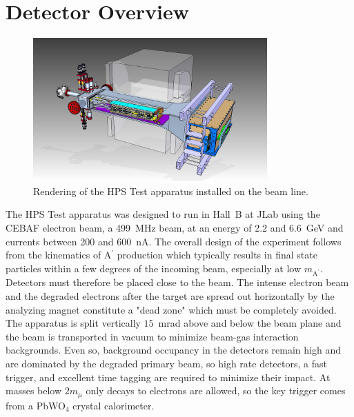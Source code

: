 \documentclass[final,3p,times,twocolumn]{elsarticle}
\newcommand{\Aprime}{A\ensuremath{^\prime}}
\begin{document}
\section{Detector Overview}
\label{detector}
{\small
\begin{figure}[t]
\begin{center}
    \includegraphics[width=0.8\textwidth]{figures/hps_testrun_rendering}
\caption{Rendering of the HPS Test apparatus installed on the beam line.}
\label{fig:testrundetector}
\end{center}
\end{figure}
}
The HPS Test apparatus was designed to run in Hall~B at JLab using the CEBAF electron beam, a 
499~MHz beam, at an energy of 2.2 and 6.6~GeV and currents between 200 and 600~nA.  
The overall design of the experiment follows from the kinematics of \Aprime{} production which 
typically results in final state particles within a few degrees of the incoming beam, especially at low 
$m_{\textrm{A}^\prime}$. Detectors must therefore be placed close to the beam. 
The intense electron beam and the degraded electrons after the target are spread out horizontally by 
the analyzing magnet constitute a "dead zone" which must be completely avoided. The apparatus is 
split vertically $15$~mrad above and below the beam plane and the beam is transported in vacuum 
to minimize beam-gas interaction backgrounds. Even so, background occupancy in the detectors 
remain high and are dominated by the degraded primary beam, so high rate detectors, a fast trigger, 
and excellent time tagging are required to minimize their impact.  
At masses below $2 m_\mu$ only decays to electrons are allowed, so the key trigger comes from a PbWO$_{4}$ crystal calorimeter. 
\end{document}
